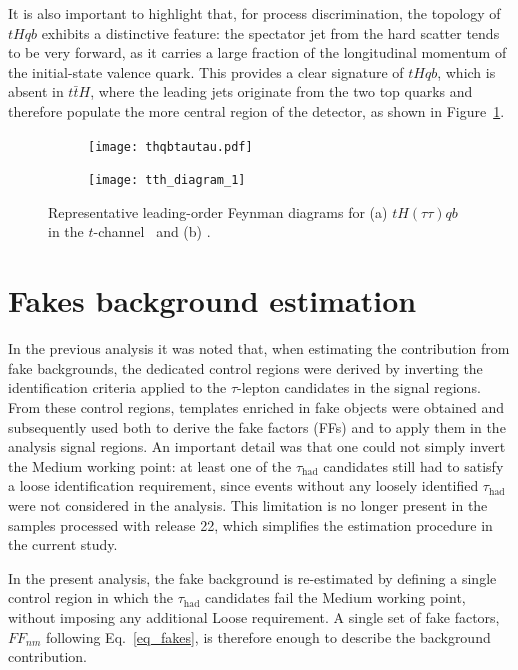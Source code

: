 It is also important to highlight that, for process discrimination, the topology of $tHqb$ exhibits a distinctive feature: the spectator jet from the hard scatter tends to be very forward, as it carries a large fraction of the longitudinal momentum of the initial-state valence quark. This provides a clear signature of $tHqb$, which is absent in $t\bar{t}H$, where the leading jets originate from the two top quarks and therefore populate the more central region of the detector, as shown in Figure~\ref{fig:feynman_tH_ttH}.
\begin{figure}[htbp]
    \centering
    \begin{subfigure}[b]{0.37\textwidth}
      \centering
      \texttt{[image: thqbtautau.pdf]}
      \caption{}
    \end{subfigure}
    \begin{subfigure}[b]{0.4\textwidth}
      \centering
      \texttt{[image: tth\_diagram\_1]}
      \caption{}
    \end{subfigure}
    \caption{Representative leading-order Feynman diagrams for (a) $tH(\tau\tau)qb$ in the $t$-channel~\cite{Barger_2010} and (b) \ttHtt.}
    \label{fig:feynman_tH_ttH}
  \end{figure}



\section{Fakes background estimation}
\label{fakes_run3}

In the previous analysis it was noted that, when estimating the contribution from fake backgrounds, the dedicated control regions were derived by inverting the identification criteria applied to the $\tau$-lepton candidates in the signal regions. From these control regions, templates enriched in fake objects were obtained and subsequently used both to derive the fake factors (FFs) and to apply them in the analysis signal regions. An important detail was that one could not simply invert the Medium working point: at least one of the $\tau_{\mathrm{had}}$ candidates still had to satisfy a loose identification requirement, since events without any loosely identified $\tau_{\mathrm{had}}$ were not considered in the analysis. This limitation is no longer present in the samples processed with release 22, which simplifies the estimation procedure in the current study.

In the present analysis, the fake background is re-estimated by defining a single control region in which the $\tau_{\mathrm{had}}$ candidates fail the Medium working point, without imposing any additional Loose requirement. A single set of fake factors, $FF_{nm}$ following Eq.~\ref{eq_fakes}, is therefore enough to describe the background contribution. 

